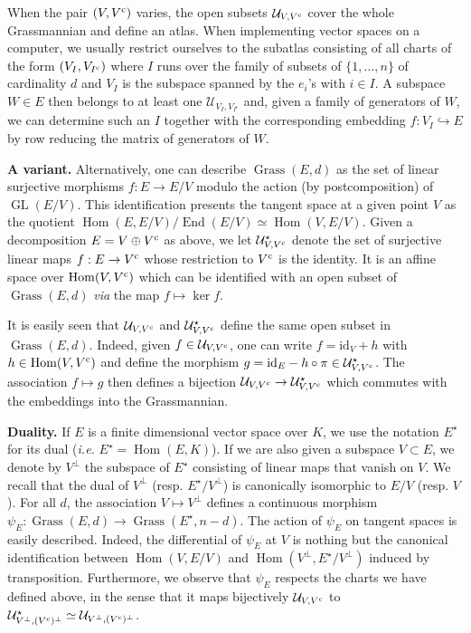 \documentclass{sig-alternate}
\DeclareMathOperator{\Hom}{Hom}
\DeclareMathOperator{\End}{End}
\DeclareMathOperator{\GL}{GL}
\DeclareMathOperator{\Grass}{Grass}
\newcommand{\id}{\textrm{id}}
\renewcommand{\c}{\text{\rm c}}
\begin{document}
When the pair $(V, V^\c)$ varies, the open subsets $\mathcal 
U_{V,V^\c}$ cover the whole Grassmannian and define an atlas.
When implementing vector spaces on a computer, we usually restrict 
ourselves to the subatlas consisting of all charts of the form $(V_I, 
V_{I^\c})$ where $I$ runs over the family of subsets of $\{1, 
\ldots, n\}$ of cardinality $d$ and $V_I$ is the subspace spanned by 
the $e_i$'s with $i \in I$. A subspace $W \in E$ then belongs to at 
least one $\mathcal U_{V_I, V_{I^{\text{c}}}}$ and, given a family of
generators of $W$, we can determine such an $I$ together with the
corresponding embedding $f : V_I \hookrightarrow E$ by row reducing 
the matrix of generators of $W$.

\smallskip

\noindent
{\bf A variant.}
Alternatively, one can describe $\Grass(E,d)$ as the set of linear 
surjective morphisms $f : E \to E/V$ modulo the action (by 
postcomposition) of $\GL(E/V)$. This identification presents the 
tangent space at a given point $V$ as the quotient $\Hom(E, E/V) / 
\End(E/V) \simeq \Hom(V, E/V)$.
Given a decomposition $E = V \oplus V^\c$ as above, we let $\mathcal 
U^\star_{V, V^\c}$ denote the set of surjective linear maps $f : E 
\to V^\c$ whose restriction to $V^\c$ is the identity. It is an 
affine space over $\Hom(V, V^\c)$ which can be identified with an open
subset of $\Grass(E,d)$ \emph{via} the map $f \mapsto \ker f$.

It is easily seen that $\mathcal U_{V, V^\c}$ and $\mathcal 
U^\star_{V, V^\c}$ define the same open subset in $\Grass(E,d)$. 
Indeed, given $f \in \mathcal U_{V, V^\c}$, one can write $f = \id_V 
+ h$ with $h \in \Hom(V, V^\c)$ and define the morphism $g = \id_E -
h \circ \pi \in \mathcal U^\star_{V, V^\c}$. The association $f \mapsto
g$ then defines a bijection $\mathcal U_{V, V^\c} \to \mathcal
U^\star_{V, V^\c}$ which commutes with the embeddings into the
Grassmannian.

\smallskip

\noindent
{\bf Duality.}
If $E$ is a finite dimensional vector space over $K$, we use the notation 
$E^\star$ for its dual (\emph{i.e.} $E^\star = \Hom(E,K)$). If we are also given
a subspace $V \subset E$, we denote by $V^\perp$ the subspace 
of $E^\star$ consisting of linear maps that vanish on $V$. We recall
that the dual of $V^\perp$ (resp. $E^\star/V^\perp$) is canonically
isomorphic to $E/V$ (resp. $V$).
For all $d$, the association $V \mapsto V^\perp$ defines a continuous 
morphism $\psi_E : \Grass(E,d) \to \Grass(E^\star, n-d)$. The action of 
$\psi_E$ on tangent spaces is easily described. Indeed, the differential 
of $\psi_E$ at $V$ is nothing but the canonical identification between
$\Hom(V, E/V)$ and $\Hom(V^\perp, E^\star/V^\perp)$ induced by 
transposition. Furthermore, we observe that $\psi_E$ respects
the charts we have defined above, in the sense that it maps bijectively 
$\mathcal U_{V, V^\c}$ to $\mathcal U^\star_{V^\perp, (V^\c)^\perp}
\simeq \mathcal U_{V^\perp, (V^\c)^\perp}$.
\end{document}
